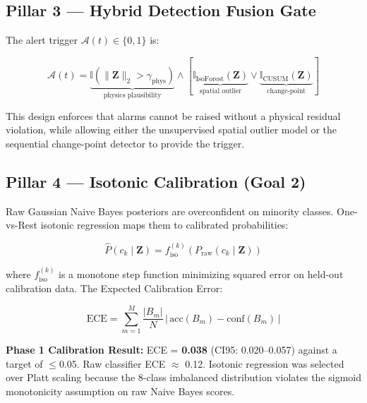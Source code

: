 \documentclass[12pt, a4paper]{article}
\begin{document}
\subsection{Pillar 3 — Hybrid Detection Fusion Gate}

The alert trigger $\mathcal{A}(t) \in \{0,1\}$ is:

\begin{equation}
\mathcal{A}(t) = \underbrace{\mathbb{I}\!\left(\|\mathbf{Z}\|_2 > \gamma_{\text{phys}}\right)}_{\text{physics plausibility}} \wedge \left[\underbrace{\mathbb{I}_{\text{IsoForest}}(\mathbf{Z})}_{\text{spatial outlier}} \vee \underbrace{\mathbb{I}_{\text{CUSUM}}(\mathbf{Z})}_{\text{change-point}}\right]
\end{equation}

This design enforces that alarms cannot be raised without a physical residual violation, while allowing either the unsupervised spatial outlier model or the sequential change-point detector to provide the trigger.

\subsection{Pillar 4 — Isotonic Calibration (Goal 2)}

Raw Gaussian Naive Bayes posteriors are overconfident on minority classes. One-vs-Rest isotonic regression maps them to calibrated probabilities:

\begin{equation}
\hat{P}(c_k\mid\mathbf{Z}) = f_{\text{iso}}^{(k)}\!\left(P_{\text{raw}}(c_k\mid\mathbf{Z})\right)
\end{equation}

where $f_{\text{iso}}^{(k)}$ is a monotone step function minimizing squared error on held-out calibration data. The Expected Calibration Error:

\begin{equation}
\text{ECE} = \sum_{m=1}^M \frac{|B_m|}{N}\,\bigl|\,\mathrm{acc}(B_m) - \mathrm{conf}(B_m)\,\bigr|
\end{equation}

\begin{tcolorbox}[resultbox]
\textbf{Phase 1 Calibration Result:} ECE = \textbf{0.038} (CI95: 0.020--0.057) against a target of $\le$0.05. Raw classifier ECE $\approx$ 0.12. Isotonic regression was selected over Platt scaling because the 8-class imbalanced distribution violates the sigmoid monotonicity assumption on raw Naive Bayes scores.
\end{tcolorbox}
\end{document}
